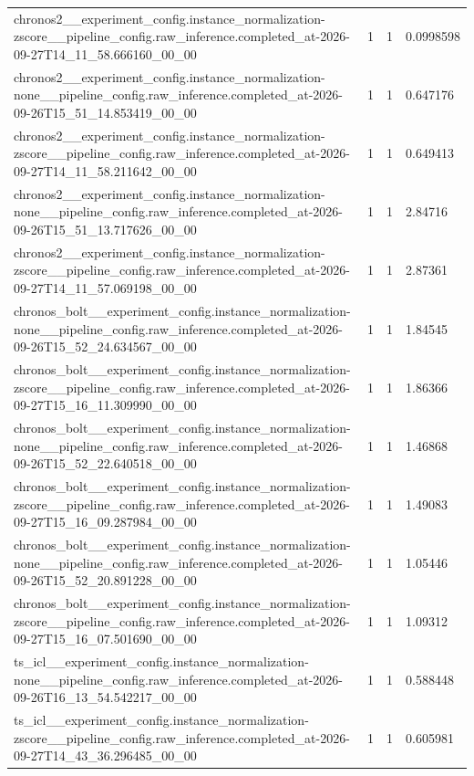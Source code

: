 \begin{tabular}{llll}
chronos2\_\_experiment\_config.instance\_normalization-zscore\_\_pipeline\_config.raw\_inference.completed\_at-2026-09-27T14\_11\_58.666160\_00\_00 & 1 & 1 & 0.0998598 \\
chronos2\_\_experiment\_config.instance\_normalization-none\_\_pipeline\_config.raw\_inference.completed\_at-2026-09-26T15\_51\_14.853419\_00\_00 & 1 & 1 & 0.647176 \\
chronos2\_\_experiment\_config.instance\_normalization-zscore\_\_pipeline\_config.raw\_inference.completed\_at-2026-09-27T14\_11\_58.211642\_00\_00 & 1 & 1 & 0.649413 \\
chronos2\_\_experiment\_config.instance\_normalization-none\_\_pipeline\_config.raw\_inference.completed\_at-2026-09-26T15\_51\_13.717626\_00\_00 & 1 & 1 & 2.84716 \\
chronos2\_\_experiment\_config.instance\_normalization-zscore\_\_pipeline\_config.raw\_inference.completed\_at-2026-09-27T14\_11\_57.069198\_00\_00 & 1 & 1 & 2.87361 \\
chronos\_bolt\_\_experiment\_config.instance\_normalization-none\_\_pipeline\_config.raw\_inference.completed\_at-2026-09-26T15\_52\_24.634567\_00\_00 & 1 & 1 & 1.84545 \\
chronos\_bolt\_\_experiment\_config.instance\_normalization-zscore\_\_pipeline\_config.raw\_inference.completed\_at-2026-09-27T15\_16\_11.309990\_00\_00 & 1 & 1 & 1.86366 \\
chronos\_bolt\_\_experiment\_config.instance\_normalization-none\_\_pipeline\_config.raw\_inference.completed\_at-2026-09-26T15\_52\_22.640518\_00\_00 & 1 & 1 & 1.46868 \\
chronos\_bolt\_\_experiment\_config.instance\_normalization-zscore\_\_pipeline\_config.raw\_inference.completed\_at-2026-09-27T15\_16\_09.287984\_00\_00 & 1 & 1 & 1.49083 \\
chronos\_bolt\_\_experiment\_config.instance\_normalization-none\_\_pipeline\_config.raw\_inference.completed\_at-2026-09-26T15\_52\_20.891228\_00\_00 & 1 & 1 & 1.05446 \\
chronos\_bolt\_\_experiment\_config.instance\_normalization-zscore\_\_pipeline\_config.raw\_inference.completed\_at-2026-09-27T15\_16\_07.501690\_00\_00 & 1 & 1 & 1.09312 \\
ts\_icl\_\_experiment\_config.instance\_normalization-none\_\_pipeline\_config.raw\_inference.completed\_at-2026-09-26T16\_13\_54.542217\_00\_00 & 1 & 1 & 0.588448 \\
ts\_icl\_\_experiment\_config.instance\_normalization-zscore\_\_pipeline\_config.raw\_inference.completed\_at-2026-09-27T14\_43\_36.296485\_00\_00 & 1 & 1 & 0.605981 \\

\end{tabular}
